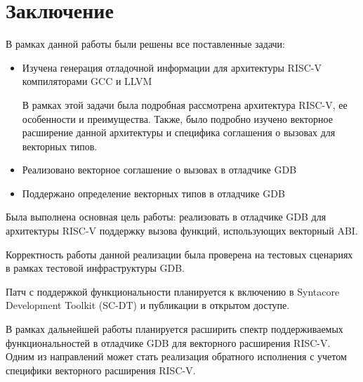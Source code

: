 \section{Заключение}
\label{sec:conclusion} 

В рамках данной работы были решены все поставленные задачи:

\begin{itemize}
\item Изучена генерация отладочной информации для архитектуры RISC-V компиляторами GCC и LLVM

В рамках этой задачи была подробная рассмотрена архитектура RISC-V, ее особенности и преимущества.
Также, было подробно изучено векторное расширение данной архитектуры и специфика соглашения о
вызовах для векторных типов.
\item Реализовано векторное соглашение о вызовах в отладчике GDB
\item Поддержано определение векторных типов в отладчике GDB
\end{itemize}

Была выполнена основная цель работы: реализовать в отладчике GDB для архитектуры RISC-V
поддержку вызова функций, использующих векторный ABI.

Корректность работы данной реализации была проверена на тестовых сценариях в рамках
тестовой инфраструктуры GDB.

Патч с поддержкой функциональности планируется к включению в Syntacore Development Toolkit (SC-DT)
и публикации в открытом доступе.

В рамках дальнейшей работы планируется расширить спектр поддерживаемых функциональностей в
отладчике GDB для векторного расширения RISC-V. Одним из направлений может стать
реализация обратного исполнения с учетом специфики векторного расширения RISC-V.

\newpage
